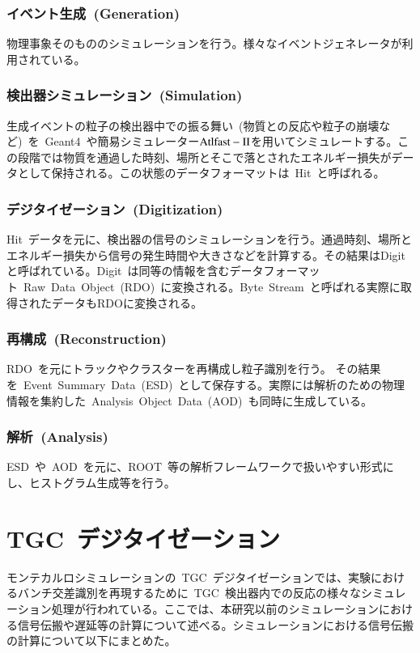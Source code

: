 \subsubsection{イベント生成~(Generation)~}
物理事象そのもののシミュレーションを行う。様々なイベントジェネレータが利用されている。

\subsubsection{検出器シミュレーション~(Simulation)~}
生成イベントの粒子の検出器中での振る舞い~(物質との反応や粒子の崩壊など)~を~Geant4~\cite{URL:22}や簡易シミュレーター$\rm{Atlfast-II}$\cite{TR:08}を用いてシミュレートする。この段階では物質を通過した時刻、場所とそこで落とされたエネルギー損失がデータとして保持される。この状態のデータフォーマットは~Hit~と呼ばれる。

\subsubsection{デジタイゼーション~(Digitization)~}
Hit~データを元に、検出器の信号のシミュレーションを行う。通過時刻、場所とエネルギー損失から信号の発生時間や大きさなどを計算する。その結果はDigitと呼ばれている。Digit~は同等の情報を含むデータフォーマット~Raw~Data~Object~(RDO)~に変換される。Byte~Stream~と呼ばれる実際に取得されたデータもRDOに変換される。

\subsubsection{再構成~(Reconstruction)~}
RDO~を元にトラックやクラスターを再構成し粒子識別を行う。
その結果を~Event~Summary~Data~(ESD)~として保存する。実際には解析のための物理情報を集約した~Analysis~Object~Data~(AOD)~も同時に生成している。

\subsubsection{解析~(Analysis)~}
ESD~や~AOD~を元に、ROOT~\cite{URL:23}等の解析フレームワークで扱いやすい形式にし、ヒストグラム生成等を行う。

\section{TGC~デジタイゼーション}
モンテカルロシミュレーションの~TGC~デジタイゼーションでは、実験におけるバンチ交差識別を再現するために~TGC~検出器内での反応の様々なシミュレーション処理が行われている。ここでは、本研究以前のシミュレーションにおける信号伝搬や遅延等の計算について述べる。シミュレーションにおける信号伝搬の計算について以下にまとめた。

